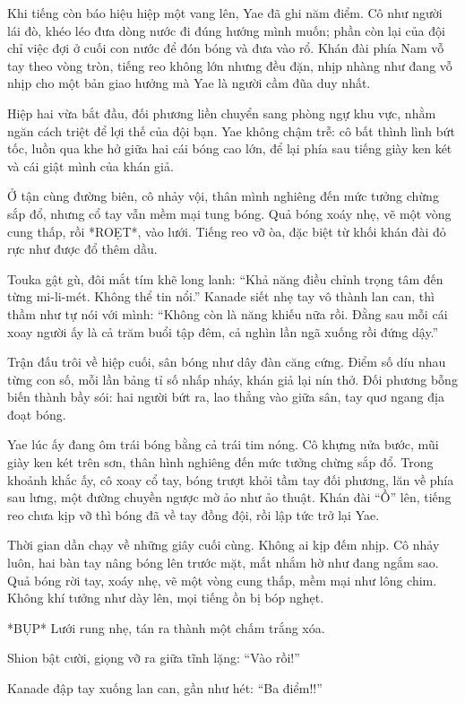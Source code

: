 \documentclass[../main.tex]{subfiles}
\begin{document}
Khi tiếng còn báo hiệu hiệp một vang lên, Yae đã ghi năm điểm.  Cô như người lái đò, khéo léo đưa dòng nước đi đúng hướng mình muốn; phần còn lại của đội chỉ việc đợi ở cuối con nước để đón bóng và đưa vào rổ.  Khán đài phía Nam vỗ tay theo vòng tròn, tiếng reo không lớn nhưng đều đặn, nhịp nhàng như đang vỗ nhịp cho một bản giao hưởng mà Yae là người cầm đũa duy nhất.

Hiệp hai vừa bắt đầu, đối phương liền chuyển sang phòng ngự khu vực, nhằm ngăn cách triệt để lợi thế của đội bạn. Yae không chậm trễ: cô bất thình lình bứt tốc, luồn qua khe hở giữa hai cái bóng cao lớn, để lại phía sau tiếng giày ken két và cái giật mình của khán giả.

Ở tận cùng đường biên, cô nhảy vội, thân mình nghiêng đến mức tưởng chừng sắp đổ, nhưng cổ tay vẫn mềm mại tung bóng. Quả bóng xoáy nhẹ, vẽ một vòng cung thấp, rồi *ROẸT*, vào lưới. Tiếng reo vỡ òa, đặc biệt từ khối khán đài đỏ rực như được đổ thêm dầu.

Touka gật gù, đôi mắt tím khẽ long lanh: ``Khả năng điều chỉnh trọng tâm đến từng mi-li-mét. Không thể tin nổi.'' Kanade siết nhẹ tay vô thành lan can, thì thầm như tự nói với mình:  ``Không còn là năng khiếu nữa rồi. Đằng sau mỗi cái xoay người ấy là cả trăm buổi tập đêm, cả nghìn lần ngã xuống rồi đứng dậy.''

Trận đấu trôi về hiệp cuối, sân bóng như dây đàn căng cứng. Điểm số díu nhau từng con số, mỗi lần bảng tỉ số nhấp nháy, khán giả lại nín thở. Đối phương bỗng biến thành bầy sói: hai người bứt ra, lao thẳng vào giữa sân, tay quơ ngang địa đoạt bóng.

Yae lúc ấy đang ôm trái bóng bằng cả trái tim nóng. Cô khựng nửa bước, mũi giày ken két trên sơn, thân hình nghiêng đến mức tưởng chừng sắp đổ. Trong khoảnh khắc ấy, cô xoay cổ tay, bóng trượt khỏi tầm tay đối phương, lăn về phía sau lưng, một đường chuyền ngược mờ ảo như ảo thuật. Khán đài ``Ồ'' lên, tiếng reo chưa kịp vỡ thì bóng đã về tay đồng đội, rồi lập tức trở lại Yae.

Thời gian dần chạy về những giây cuối cùng. Không ai kịp đếm nhịp. Cô nhảy luôn, hai bàn tay nâng bóng lên trước mặt, mắt nhắm hờ như đang ngắm sao. Quả bóng rời tay, xoáy nhẹ, vẽ một vòng cung thấp, mềm mại như lông chim.
Không khí tưởng như dày lên, mọi tiếng ồn bị bóp nghẹt.

*BỤP* Lưới rung nhẹ, tán ra thành một chấm trắng xóa.

Shion bật cười, giọng vỡ ra giữa tĩnh lặng: ``Vào rồi!''

Kanade đập tay xuống lan can, gần như hét: ``Ba điểm!!''
\end{document}
